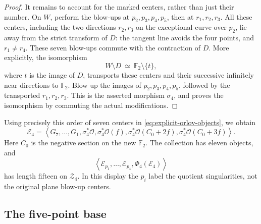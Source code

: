 \documentclass[11pt]{article}
\theoremstyle{plain}
\theoremstyle{definition}
\theoremstyle{remark}
\newcommand{\F}{\mathbb F}
\newcommand{\OO}{\mathcal O}
\begin{document}
\begin{proof}
It remains to account for the marked centers, rather than just their
number. On \(W\), perform the blow-ups at \(p_2,p_3,p_4,p_5\),
then at \(r_1,r_2,r_3\). All these centers, including the two
directions \(r_2,r_3\) on the exceptional curve over \(p_2\),
lie away from the strict transform of \(D\): the tangent line
avoids the four points, and \(r_1\ne r_4\). These seven blow-ups
commute with the contraction of \(D\). More explicitly, the
isomorphism
\[
W\setminus D\ \simeq\ \F_2\setminus\{t\},
\]
where \(t\) is the image of \(D\), transports these centers and
their successive infinitely near directions to \(\F_2\). Blow
up the images of \(p_2,p_3,p_4,p_5\), followed by the transported
\(r_1,r_2,r_3\). This is the asserted morphism \(\sigma_4\),
and proves the isomorphism by commuting the actual modifications.
\end{proof}

Using precisely this order of seven centers in
\eqref{eq:explicit-orlov-objects}, we obtain
\[
\mathscr E_4=\left\langle G_7,\ldots,G_1,
\sigma_4^*\OO,\sigma_4^*\OO(f),
\sigma_4^*\OO(C_0+2f),\sigma_4^*\OO(C_0+3f)\right\rangle.
\]
Here \(C_0\) is the negative section on the new \(\F_2\).
The collection has eleven objects, and
\[
\left\langle\mathcal E_{p_1},\ldots,\mathcal E_{p_4},
\Phi_4(\mathscr E_4)\right\rangle
\]
has length fifteen on \(\mathcal Z_4\). In this display the \(p_i\)
label the quotient singularities, not the original plane blow-up centers.

\subsection{The five-point base}
\label{app:explicit-base-five}
\end{document}
